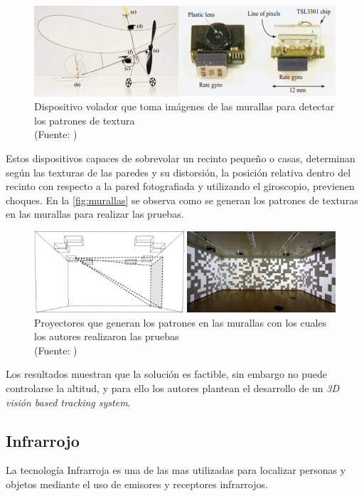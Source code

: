 \begin{figure}[ht!]
\centering
\includegraphics[width=.4\textwidth]{figures/10gr.png}
\caption[10gr]{Dispositivo volador que toma imágenes de las murallas para detectar los patrones de textura\\
{\scriptsize (Fuente: \citep{4058367})}}
\label{fig:10gr}
\end{figure}

Estos dispositivos capaces de sobrevolar un recinto pequeño o casas, determinan según las texturas de las paredes y su distorsión, la posición relativa dentro del recinto con respecto a la pared fotografiada y utilizando el giroscopio, previenen choques. En la  \autoref{fig:murallas} se observa como se generan los patrones de texturas en las murallas para realizar las pruebas.\\

\begin{figure}[ht!]
\centering
\includegraphics[width=.4\textwidth]{figures/Murallas.png}
\caption[Murallas]{Proyectores que generan los patrones en las murallas con los cuales los autores realizaron las pruebas\\
{\scriptsize (Fuente: \citep{4058367})}}
\label{fig:murallas}
\end{figure}

Los resultados muestran que la solución es factible, sin embargo no puede controlarse la altitud, y para ello los autores plantean el desarrollo de un \textit{3D visión based tracking system}.


\subsection{Infrarrojo}

La tecnología Infrarroja es una de las mas utilizadas para localizar personas y objetos mediante el uso de emisores y receptores infrarrojos.

